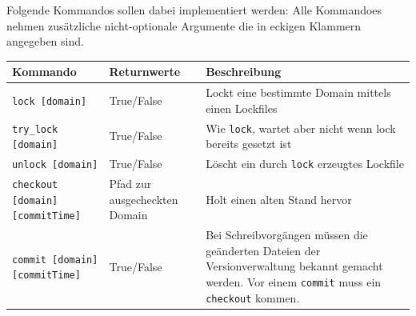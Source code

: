 Folgende Kommandos sollen dabei implementiert werden:
Alle Kommandoes nehmen zusätzliche nicht-optionale Argumente die in
eckigen Klammern angegeben sind.
\begin{table}[h]
  \begin{tabular}{|p{4cm}|p{5cm}|p{7cm}|}
    \hline
    \textbf{Kommando} & \textbf{Returnwerte} & \textbf{Beschreibung} \\
    \hline
    \texttt{lock [domain]} 
    & True/False 
    & Lockt eine bestimmte Domain mittels einen Lockfiles 
    \\
    \hline
    \texttt{try\_lock [domain]} 
    & True/False 
    & Wie \texttt{lock}, wartet aber nicht wenn lock bereits gesetzt ist 
    \\
    \hline
    \texttt{unlock [domain]} 
    & True/False 
    & Löscht ein durch \texttt{lock} erzeugtes Lockfile 
    \\
    \hline
    \texttt{checkout [domain] [commitTime]} 
    & Pfad zur ausgecheckten Domain
    & Holt einen alten Stand hervor
    \\
    \hline
    \texttt{commit [domain] [commitTime]} 
    & True/False 
    & Bei Schreibvorgängen müssen die geänderten Dateien
      der Versionverwaltung bekannt gemacht werden.
      Vor einem \texttt{commit} muss ein \texttt{checkout} kommen.
    \\
    \hline
  \end{tabular}
\end{table}
